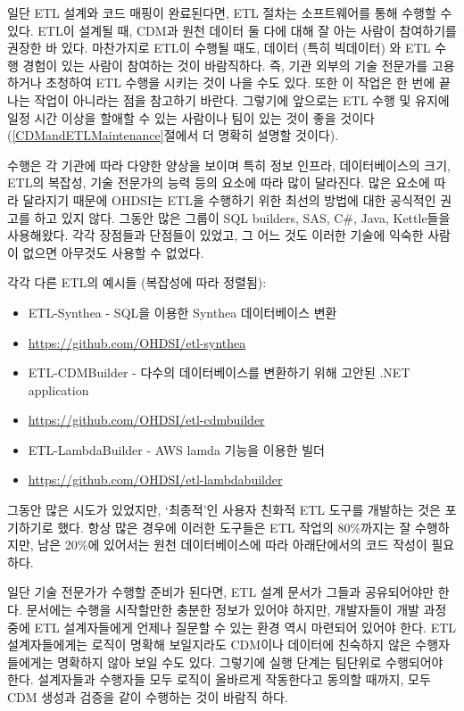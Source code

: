 \documentclass[11pt]{book}
\providecommand{\tightlist}{%
  \setlength{\itemsep}{0pt}\setlength{\parskip}{0pt}}
\theoremstyle{definition}
\theoremstyle{definition}
\theoremstyle{definition}
\theoremstyle{remark}
\begin{document}
일단 ETL 설계와 코드 매핑이 완료된다면, ETL 절차는 소프트웨어를 통해
수행할 수 있다. ETL이 설계될 때, CDM과 원천 데이터 둘 다에 대해 잘 아는
사람이 참여하기를 권장한 바 있다. 마찬가지로 ETL이 수행될 때도, 데이터
(특히 빅데이터) 와 ETL 수행 경험이 있는 사람이 참여하는 것이 바람직하다.
즉, 기관 외부의 기술 전문가를 고용하거나 초청하여 ETL 수행을 시키는 것이
나을 수도 있다. 또한 이 작업은 한 번에 끝나는 작업이 아니라는 점을
참고하기 바란다. 그렇기에 앞으로는 ETL 수행 및 유지에 일정 시간 이상을
할애할 수 있는 사람이나 팀이 있는 것이 좋을
것이다(\ref{CDMandETLMaintenance}절에서 더 명확히 설명할 것이다).

수행은 각 기관에 따라 다양한 양상을 보이며 특히 정보 인프라,
데이터베이스의 크기, ETL의 복잡성, 기술 전문가의 능력 등의 요소에 따라
많이 달라진다. 많은 요소에 따라 달라지기 때문에 OHDSI는 ETL을 수행하기
위한 최선의 방법에 대한 공식적인 권고를 하고 있지 않다. 그동안 많은
그룹이 SQL builders, SAS, C\#, Java, Kettle들을 사용해왔다. 각각
장점들과 단점들이 있었고, 그 어느 것도 이러한 기술에 익숙한 사람이
없으면 아무것도 사용할 수 없었다.

각각 다른 ETL의 예시들 (복잡성에 따라 정렬됨):

\begin{itemize}
\tightlist
\item
  ETL-Synthea - SQL을 이용한 Synthea 데이터베이스 변환
\item
  \url{https://github.com/OHDSI/etl-synthea}
\item
  ETL-CDMBuilder - 다수의 데이터베이스를 변환하기 위해 고안된 .NET
  application
\item
  \url{https://github.com/OHDSI/etl-cdmbuilder}
\item
  ETL-LambdaBuilder - AWS lamda 기능을 이용한 빌더
\item
  \url{https://github.com/OHDSI/etl-lambdabuilder}
\end{itemize}

그동안 많은 시도가 있었지만, `최종적'인 사용자 친화적 ETL 도구를
개발하는 것은 포기하기로 했다. 항상 많은 경우에 이러한 도구들은 ETL
작업의 80\%까지는 잘 수행하지만, 남은 20\%에 있어서는 원천
데이터베이스에 따라 아래단에서의 코드 작성이 필요하다.

일단 기술 전문가가 수행할 준비가 된다면, ETL 설계 문서가 그들과
공유되어야만 한다. 문서에는 수행을 시작할만한 충분한 정보가 있어야
하지만, 개발자들이 개발 과정 중에 ETL 설계자들에게 언제나 질문할 수 있는
환경 역시 마련되어 있어야 한다. ETL 설계자들에게는 로직이 명확해
보일지라도 CDM이나 데이터에 친숙하지 않은 수행자들에게는 명확하지 않아
보일 수도 있다. 그렇기에 실행 단계는 팀단위로 수행되어야 한다.
설계자들과 수행자들 모두 로직이 올바르게 작동한다고 동의할 때까지, 모두
CDM 생성과 검증을 같이 수행하는 것이 바람직 하다.
\end{document}

